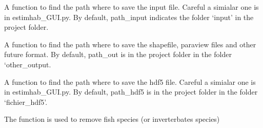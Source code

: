 \documentclass[letterpaper,10pt,english]{sphinxmanual}
\begin{document}
\begin{fulllineitems}
\begin{fulllineitems}
\end{fulllineitems}


\begin{fulllineitems}
\label{\detokenize{index:src_GUI.estimhab_GUI.StatModUseful.find_path_input_est}}
A function to find the path where to save the input file. Careful a simialar one is in estimhab\_GUI.py. By default,
path\_input indicates the folder `input' in the project folder.

\end{fulllineitems}


\begin{fulllineitems}
\label{\detokenize{index:src_GUI.estimhab_GUI.StatModUseful.find_path_output_est}}
A function to find the path where to save the shapefile, paraview files and other future format. By default,
path\_out is in the project folder in the folder `other\_output.

\end{fulllineitems}


\begin{fulllineitems}
\label{\detokenize{index:src_GUI.estimhab_GUI.StatModUseful.find_path_text_est}}
A function to find the path where to save the hdf5 file. Careful a simialar one is in estimhab\_GUI.py. By default,
path\_hdf5 is in the project folder in the folder `fichier\_hdf5'.

\end{fulllineitems}


\begin{fulllineitems}
\label{\detokenize{index:src_GUI.estimhab_GUI.StatModUseful.remove_fish}}
The function is used to remove fish species (or inverterbates species)

\end{fulllineitems}


\end{fulllineitems}
\end{document}
